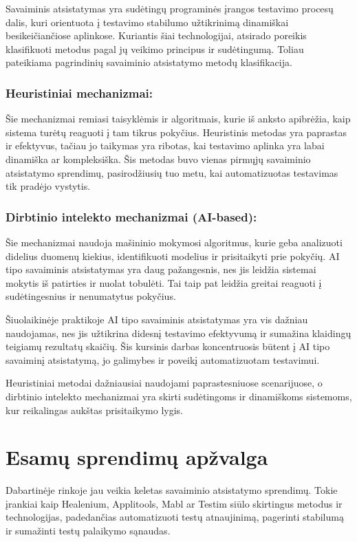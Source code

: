 \documentclass[
]{VUMIFPSkursinis}
\begin{document}
Savaiminis atsistatymas yra sudėtingų programinės įrangos testavimo procesų dalis, kuri orientuota į testavimo stabilumo užtikrinimą dinamiškai besikeičiančiose aplinkose. Kuriantis šiai technologijai, atsirado poreikis klasifikuoti metodus pagal jų veikimo principus ir sudėtingumą. Toliau pateikiama pagrindinių savaiminio atsistatymo metodų klasifikacija.

\subsubsection{Heuristiniai mechanizmai:} Šie mechanizmai remiasi taisyklėmis ir algoritmais, kurie iš anksto apibrėžia, kaip sistema turėtų reaguoti į tam tikrus pokyčius. Heuristinis metodas yra paprastas ir efektyvus, tačiau jo taikymas yra ribotas, kai testavimo aplinka yra labai dinamiška ar kompleksiška. Šis metodas buvo vienas pirmųjų savaiminio atsistatymo sprendimų, pasirodžiusių tuo metu, kai automatizuotas testavimas tik pradėjo vystytis.
    
\subsubsection{Dirbtinio intelekto mechanizmai (AI-based):} Šie mechanizmai naudoja mašininio mokymosi algoritmus, kurie geba analizuoti didelius duomenų kiekius, identifikuoti modelius ir prisitaikyti prie pokyčių. AI tipo savaiminis atsistatymas yra daug pažangesnis, nes jis leidžia sistemai mokytis iš patirties ir nuolat tobulėti. Tai taip pat leidžia greitai reaguoti į sudėtingesnius ir nenumatytus pokyčius.

Šiuolaikinėje praktikoje AI tipo savaiminis atsistatymas yra vis dažniau naudojamas, nes jis užtikrina didesnį testavimo efektyvumą ir sumažina klaidingų teigiamų rezultatų skaičių. Šis kursinis darbas koncentruosis būtent į AI tipo savaiminį atsistatymą, jo galimybes ir poveikį automatizuotam testavimui.

Heuristiniai metodai dažniausiai naudojami paprastesniuose scenarijuose, o dirbtinio intelekto mechanizmai yra skirti sudėtingoms ir dinamiškoms sistemoms, kur reikalingas aukštas prisitaikymo lygis.

\section{Esamų sprendimų apžvalga}

Dabartinėje rinkoje jau veikia keletas savaiminio atsistatymo sprendimų. Tokie įrankiai kaip Healenium, Applitools, Mabl ar Testim siūlo skirtingus metodus ir technologijas, padedančias automatizuoti testų atnaujinimą, pagerinti stabilumą ir sumažinti testų palaikymo sąnaudas.
\end{document}
